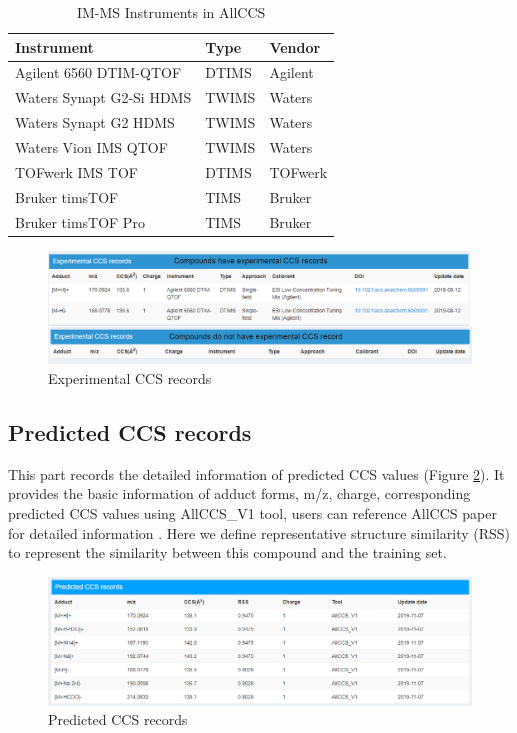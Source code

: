 \documentclass[12pt,]{book}
\theoremstyle{definition}
\theoremstyle{definition}
\theoremstyle{definition}
\theoremstyle{remark}
\begin{document}
\begin{table}

\caption{\label{tab:table2d3}IM-MS Instruments in AllCCS}
\centering
\begin{tabular}[t]{lll}
\toprule
Instrument & Type & Vendor\\
\midrule
Agilent 6560 DTIM-QTOF & DTIMS & Agilent\\
Waters Synapt G2-Si HDMS & TWIMS & Waters\\
Waters Synapt G2 HDMS & TWIMS & Waters\\
Waters Vion IMS QTOF & TWIMS & Waters\\
TOFwerk IMS TOF & DTIMS & TOFwerk\\
\addlinespace
Bruker timsTOF & TIMS & Bruker\\
Bruker timsTOF Pro & TIMS & Bruker\\
\bottomrule
\end{tabular}
\end{table}

\begin{figure}

{\centering \includegraphics{images/chapter2/figure2.5compound_card_exp_ccs} 

}

\caption{Experimental CCS records}\label{fig:figure2d5}
\end{figure}

\subsection{Predicted CCS records}\label{chapter2d2d4}

This part records the detailed information of predicted CCS values
(Figure \ref{fig:figure2d6}). It provides the basic information of
adduct forms, m/z, charge, corresponding predicted CCS values using
AllCCS\_V1 tool, users can reference AllCCS paper for detailed
information \citep{reference10}. Here we define representative structure
similarity (RSS) to represent the similarity between this compound and
the training set.

\begin{figure}

{\centering \includegraphics{images/chapter2/figure2.6predicted_ccs} 

}

\caption{Predicted CCS records}\label{fig:figure2d6}
\end{figure}
\end{document}
